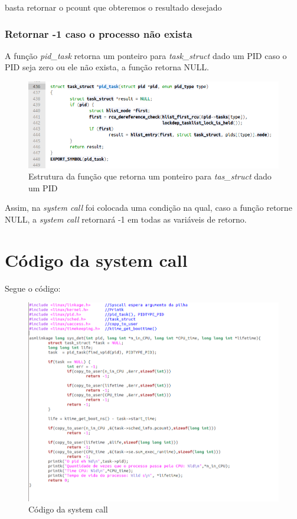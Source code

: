 \documentclass[12pt]{article}
\begin{document}
 	basta retornar o pcount que obteremos o resultado desejado
 \pagebreak
 
\subsubsection{Retornar -1 caso o processo não exista}
A função \textit{pid\_task} retorna um ponteiro para \textit{task\_struct} dado um PID caso o PID seja zero ou ele não exista, a função retorna NULL\cite{getpid}.

\begin{figure}[!htb]
	\centering
\includegraphics[scale=0.5]{imagens/pid.png} 
	\caption{Estrutura da função que retorna um ponteiro para \textit{tas\_struct} dado um PID}
\end{figure}

Assim, na \textit{system call} foi colocada uma condição na qual, caso a função retorne NULL, a \textit{system call} retornará -1 em todas as variáveis de retorno.
\pagebreak
\section{Código da system call}
	Segue o código:


\begin{figure}[!htb]
	\centering
\includegraphics[scale=0.5]{imagens/codigosys.png} 
	\caption{Código da system call}
\end{figure}
	
\end{document}
